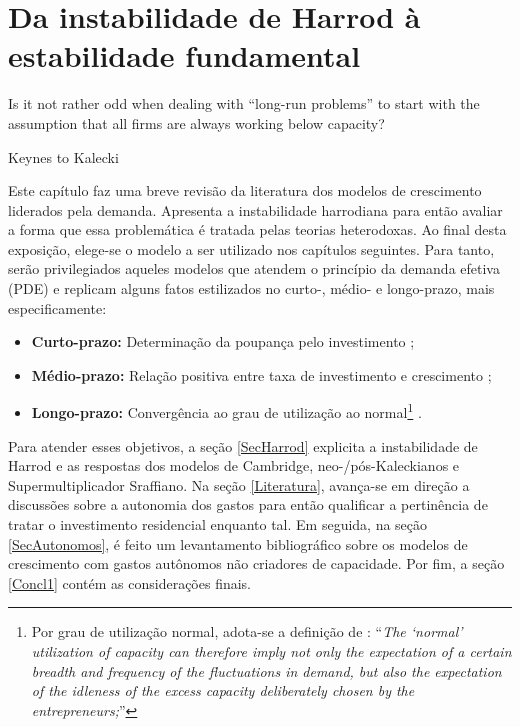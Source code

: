 \chapter{Da instabilidade de Harrod à estabilidade fundamental}
\label{CapTeorico}

\epigraph{Is it not rather odd when dealing with ``long-run problems'' to start with the assumption that all firms are always working below capacity?}{Keynes to Kalecki}


Este capítulo faz uma breve revisão da literatura dos modelos de crescimento liderados pela demanda. Apresenta a instabilidade harrodiana para então avaliar a forma que essa problemática é tratada pelas teorias heterodoxas.
Ao final desta exposição,  elege-se o modelo a ser utilizado nos capítulos seguintes.
Para tanto, serão privilegiados aqueles modelos que atendem o princípio da demanda efetiva (PDE)  e replicam alguns fatos estilizados no curto-, médio- e longo-prazo, mais especificamente:
\begin{itemize}
	\item \textbf{Curto-prazo:} Determinação da poupança pelo investimento \cite{keynes_general_1936};
	\item \textbf{Médio-prazo:} Relação positiva entre taxa de investimento e crescimento \cite{cesaratto_neo-kaleckian_2015};
	\item \textbf{Longo-prazo:} Convergência ao grau de utilização ao normal\footnote{Por grau de utilização normal, adota-se a definição de \textcites[p.~423--4, Original de 1986]{ciccone_2017}: ``\textit{The `normal' utilization of capacity can therefore imply not only the expectation of a certain breadth and frequency of the fluctuations in demand, but also the expectation of the idleness of the excess capacity deliberately chosen by the entrepreneurs;}'' } \cites{ciccone_2017}{vianello_pace_1985}.
\end{itemize}



Para atender esses objetivos, a seção \ref{SecHarrod} explicita a instabilidade de Harrod e as respostas dos modelos de Cambridge, neo-/pós-Kaleckianos e Supermultiplicador Sraffiano. 
Na seção \ref{Literatura}, avança-se em direção a discussões sobre a autonomia dos gastos para então qualificar a pertinência de tratar o investimento residencial enquanto tal.
Em seguida, na seção \ref{SecAutonomos}, é feito um levantamento bibliográfico sobre os modelos de crescimento com gastos autônomos não criadores de capacidade. 
Por fim, a seção \ref{Concl1} contém as considerações finais.






